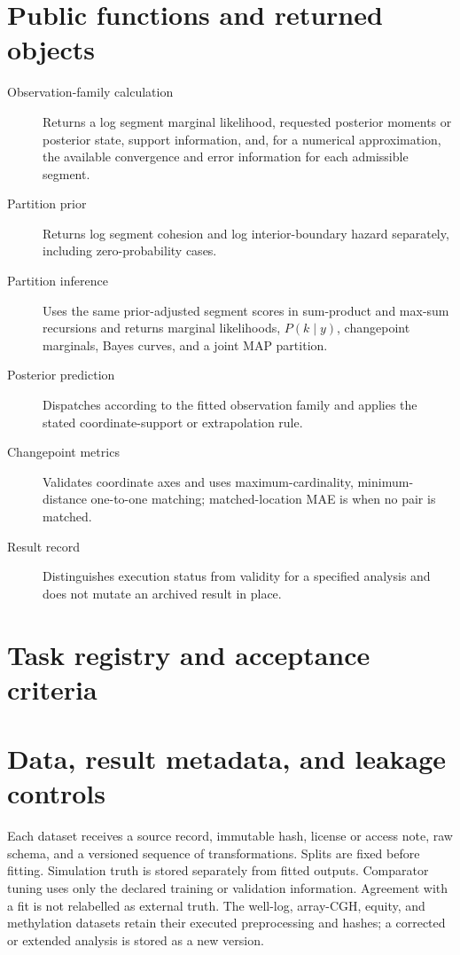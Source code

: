 \section{Public functions and returned objects}
\begin{description}
\item[Observation-family calculation] Returns a log segment marginal likelihood, requested
posterior moments or posterior state, support information, and, for a numerical approximation, the
available convergence and error information for each admissible segment.
\item[Partition prior] Returns log segment cohesion and log interior-boundary hazard separately,
including zero-probability cases.
\item[Partition inference] Uses the same prior-adjusted segment scores in sum-product and max-sum
recursions and returns marginal likelihoods, $P(k\mid y)$, changepoint marginals, Bayes curves, and a
joint MAP partition.
\item[Posterior prediction] Dispatches according to the fitted observation family and applies the
stated coordinate-support or extrapolation rule.
\item[Changepoint metrics] Validates coordinate axes and uses maximum-cardinality,
minimum-distance one-to-one matching; matched-location MAE is \NA{} when no pair is matched.
\item[Result record] Distinguishes execution status from validity for a specified analysis and does
not mutate an archived result in place.
\end{description}

\section{Task registry and acceptance criteria}


\section{Data, result metadata, and leakage controls}
Each dataset receives a source record, immutable hash, license or access note, raw schema, and a
versioned sequence of transformations. Splits are fixed before fitting. Simulation truth is stored
separately from fitted outputs. Comparator tuning uses only the declared training or validation
information. Agreement with a \BayesBreak fit is not relabelled as external truth. The well-log,
array-CGH, equity, and methylation datasets retain their executed preprocessing and hashes; a
corrected or extended analysis is stored as a new version.

